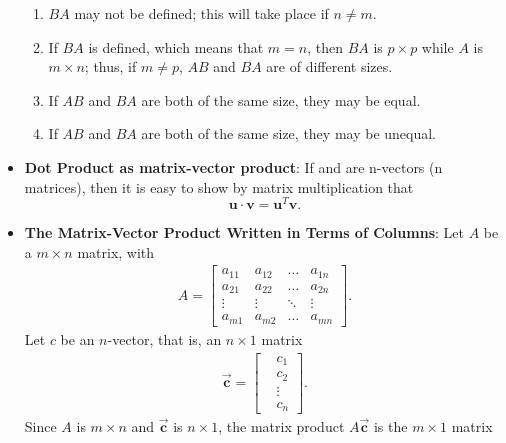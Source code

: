 \documentclass{report}
\begin{document}
\begin{itemize}
                \begin{enumerate}
                    \item \(BA\) may not be defined; this will take place if \(n \neq m\).
                    \item If \(BA\) is defined, which means that \(m = n\), then \(BA\) is \(p \times p\) while \(A\) is \(m \times n\); thus, if \(m \neq p\), \(AB\) and \(BA\) are of different sizes.
                    \item If \(AB\) and \(BA\) are both of the same size, they may be equal.
                    \item If \(AB\) and \(BA\) are both of the same size, they may be unequal.
                \end{enumerate}
            \item \textbf{Dot Product as matrix-vector product}:
                If  and  are n-vectors (n  matrices), then it is easy to show by matrix multiplication that
                \[
                    \mathbf{u} \cdot \mathbf{v} = \mathbf{u}^T \mathbf{v}.
                \]
            \item \textbf{The Matrix-Vector Product Written in Terms of Columns}:
                Let $A$ be a $m\times n$ matrix, with
                \begin{align*}
                    A = 
                    \begin{bmatrix}
                        a_{11}& a_{12} & \ldots & a_{1n} \\
                        a_{21}& a_{22} & \ldots & a_{2n} \\
                        \vdots & \vdots & \ddots &\vdots \\
                        a_{m1} & a_{m2} & \ldots & a_{mn}
                    \end{bmatrix}
                .\end{align*}
                Let $c$ be an $n$-vector, that is, an $n\times 1$ matrix
                \begin{align*}
                    \vec{\mathbf{c}} = \begin{bmatrix}
                        &c_{1}  \\ &c_{2} \\ &\vdots \\ &c_{n}
                    \end{bmatrix}
                .\end{align*}
                Since $A$ is $m\times n$ and $\vec{\mathbf{c}}$ is $n\times 1 $, the matrix product $A\vec{\mathbf{c}}$ is the $m\times 1$ matrix

\end{itemize}
\end{document}
